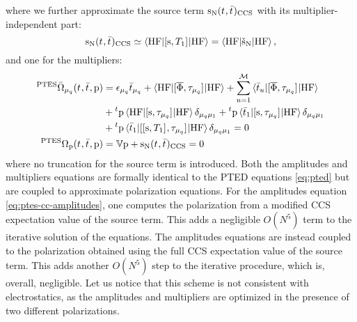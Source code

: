 where we further approximate the source term
$\mathrm{s}_{\mathrm{N}}(t_{},\bar{t}_{})_\mathrm{CCS}$ with its
multiplier-independent part:
\begin{equation}\label{eq:pte-s-source}
  \mathrm{s}_{\mathrm{N}}(t_{}, \bar{t}_{})_\mathrm{CCS}
  \simeq
  \braket{\mathrm{HF} | [ \mathrm{s}, T_1 ]^{} | \mathrm{HF}}
  =
  \braket{\mathrm{HF} | \check{\mathrm{s}}_{\mathrm{N}} | \mathrm{HF}},
\end{equation}
and one for the multipliers:
\begin{subequations}\label{eq:ptes-mult}
  \begin{align}
   {}^{\mathrm{PTES}}\bar{\Omega}_{\mu_q}(t_{}, \bar{t}_{}, \mathrm{p})
    &=
    \epsilon_{\mu_q}\bar{t}_{\mu_q} +
    \braket{\mathrm{HF} | [ \overline{\Phi}, \tau_{\mu_q} ]^{} | \mathrm{HF}} +
    \sum_{u=1}^{\mathcal{M}}\braket{\bar{t}_{u} |
    [ \overline{\Phi}, \tau_{\mu_q} ]^{} | \mathrm{HF}}
    \nonumber \\
    &+
    {}^t\mathrm{p}\braket{\mathrm{HF} | [ \mathrm{s}, \tau_{\mu_q} ]^{} | \mathrm{HF}}\delta_{\mu_q\mu_1}
    +
    {}^t\mathrm{p}\braket{\bar{t}_{1} |
    [ \mathrm{s}, \tau_{\mu_q} ]^{} | \mathrm{HF}}\delta_{\mu_q\mu_1}
     \nonumber \\
    &+
    {}^t\mathrm{p}\braket{\bar{t}_{1} |
    [ [ \mathrm{s}, T_1 ]^{}, \tau_{\mu_q} ]^{} | \mathrm{HF}}\delta_{\mu_q\mu_1}
             = 0 \label{eq:ptes-cc-multipliers} \\
    {}^{\mathrm{PTES}}\Omega_{\mathrm{p}}(t_{}, \bar{t}_{}, \mathrm{p})
    &=
    \mathbb{V}\mathrm{p} + \mathrm{s}_{\mathrm{N}}(t_{}, \bar{t}_{})_\mathrm{CCS} = 0
    \label{eq:ptes-cc-polarization-mult}
  \end{align}
\end{subequations}
where no truncation for the source term is introduced.
Both the amplitudes and multipliers equations are formally identical to
the \acrshort*{PTED} equations \eqref{eq:pted} but are coupled to
approximate polarization equations.
For the amplitudes equation \eqref{eq:ptes-cc-amplitudes}, one computes
the polarization from a modified \acrshort*{CCS} expectation value of
the source term. This adds a negligible $O(N^5)$ term to the iterative
solution of the equations.
The amplitudes equations are instead coupled to the polarization
obtained using the full \acrshort*{CCS} expectation value of the source
term. This adds another $O(N^5)$ step to the iterative
procedure, which is, overall, negligible.
Let us notice that this scheme is not consistent with electrostatics, as
the amplitudes and multipliers are optimized in the presence of two
different polarizations.

